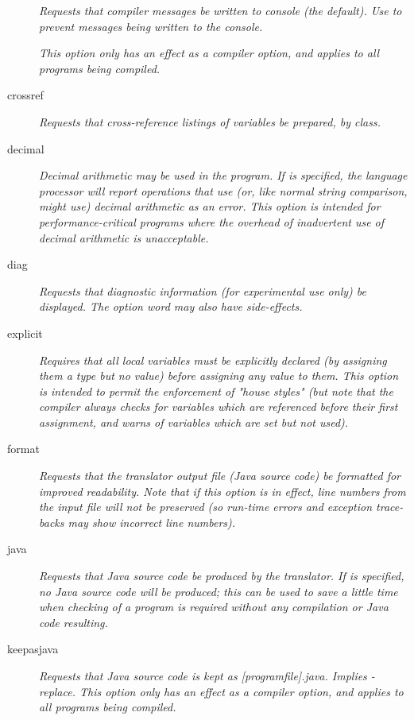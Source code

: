 \begin{description}
\emph{Requests that compiler messages be written to console (the default).
Use  to prevent messages being written to the
console.}
 
\emph{This option only has an effect as a compiler option, and applies to all
programs being compiled.}
\item[crossref]
\emph{Requests that cross-reference listings of variables be prepared,
by class.}
\item[decimal]

\emph{Decimal arithmetic may be used in the program.  If  is
specified, the language processor will report operations that use (or,
like normal string comparison, might use) decimal arithmetic as an
error.  This option is intended for performance-critical programs where
the overhead of inadvertent use of decimal arithmetic is
unacceptable.}
\item[diag]
\emph{Requests that diagnostic information (for experimental use only)
be displayed.
The  option word may also have side-effects.}
\item[explicit]

\emph{Requires that all local variables must be explicitly declared (by
assigning them a type but no value) before assigning any value to them.
This option is intended to permit the enforcement of "house styles"
(but note that the \nr{} compiler always checks for variables which
are referenced before their first assignment, and warns of variables
which are set but not used).}
\item[format]
\emph{Requests that the translator output file (Java source code) be
formatted for improved readability.
Note that if this option is in effect, line numbers from the input file
will not be preserved (so run-time errors and exception trace-backs may
show incorrect line numbers).}
\item[java]

\emph{Requests that Java source code be produced by the translator.
If  is specified, no Java source code will be produced;
this can be used to save a little time when checking of a program is
required without any compilation or Java code resulting.}

\item[keepasjava]
\emph{Requests that Java source code is kept as
  [programfile].java. Implies -replace. This option only has an effect
  as a compiler option, and applies to all programs being compiled.}


\end{description}

